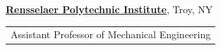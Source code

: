 
\noindent \href{https://www.rpi.edu}{\textbf{Rensselaer Polytechnic Institute}}, Troy, NY \hfill{}

\begin{tabular}{l}
Assistant Professor of Mechanical Engineering\\
\end{tabular}
\vspace{.1 in}
